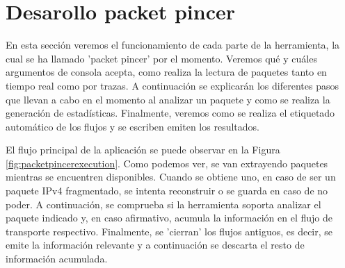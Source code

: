 \section{Desarollo packet pincer}

En esta sección veremos el funcionamiento de cada parte de la herramienta, la cual se ha llamado 'packet pincer' por el momento. Veremos qué y cuáles argumentos de consola acepta, como realiza la lectura de paquetes tanto en tiempo real como por trazas. A continuación se explicarán los diferentes pasos que llevan a cabo en el momento al analizar un paquete y como se realiza la generación de estadísticas. Finalmente, veremos como se realiza el etiquetado automático de los flujos y se escriben emiten los resultados.

El flujo principal de la aplicación se puede observar en la Figura \ref{fig:packetpincerexecution}. Como podemos ver, se van extrayendo paquetes mientras se encuentren disponibles. Cuando se obtiene uno, en caso de ser un paquete IPv4 fragmentado, se intenta reconstruir o se guarda en caso de no poder. A continuación, se comprueba si la herramienta soporta analizar el paquete indicado y, en caso afirmativo, acumula la información en el flujo de transporte respectivo. Finalmente, se 'cierran' los flujos antiguos, es decir, se emite la información relevante y a continuación se descarta el resto de información acumulada.

